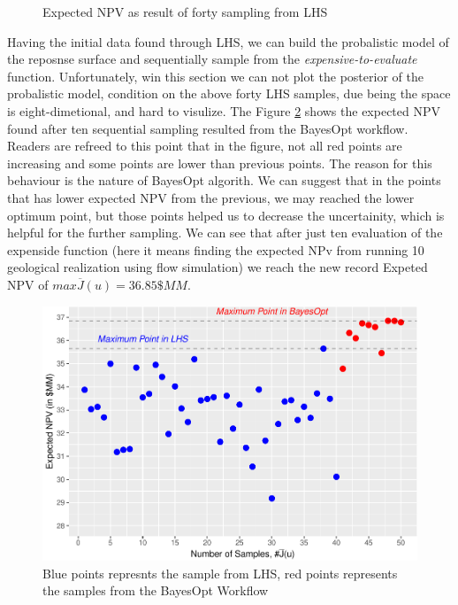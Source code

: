 \documentclass[]{elsarticle} %
\begin{document}
\begin{eqution}
\begin{figure}
{}

\caption{Expected NPV as result of forty sampling from LHS}\label{fig:lhssampling}
\end{figure}

Having the initial data found through LHS, we can build the probalistic model of the reposnse surface and sequentially sample from the \emph{expensive-to-evaluate} function. Unfortunately, win this section we can not plot the posterior of the probalistic model, condition on the above forty LHS samples, due being the space is eight-dimetional, and hard to visulize. The Figure \ref{fig:lhsbayesop} shows the expected NPV found after ten sequential sampling resulted from the BayesOpt workflow. Readers are refreed to this point that in the figure, not all red points are increasing and some points are lower than previous points. The reason for this behaviour is the nature of BayesOpt algorith. We can suggest that in the points that has lower expected NPV from the previous, we may reached the lower optimum point, but those points helped us to decrease the uncertainity, which is helpful for the further sampling. We can see that after just ten evaluation of the expenside function (here it means finding the expected NPv from running 10 geological realization using flow simulation) we reach the new record Expeted NPV of \(max \overline{J}(u)=36.85\)\(\$MM\).

\begin{figure}

{\centering \includegraphics[width=468px]{0_Paper1_main_files/figure-latex/lhsbayesop-1} 

}

\caption{Blue points represnts the sample from LHS, red points represents the samples from the BayesOpt Workflow}\label{fig:lhsbayesop}
\end{figure}


\end{eqution}
\end{document}
